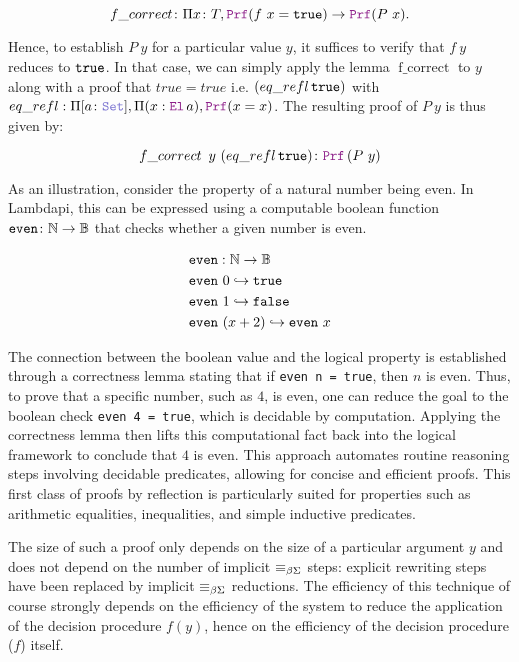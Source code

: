 \begin{equation*}
\mathop{f\_correct} \colon \Pi x \colon T, \prf (f~x = \tt{true}) \ra \prf (P~x).
\end{equation*}

Hence, to establish $P~y$ for a particular value $y$, it suffices to verify that $f~y$ reduces to  $\tt{true}$.
In that case, we can simply apply the lemma $\mathop{f\_correct}$ to $y$ along with a proof that $true = true$ i.e. $(\mathop{eq\_refl} \tt{true})$ with $eq\_refl: \Pi [a \colon \set], \Pi (x: \el\,a), \prf (x = x)$.
The resulting proof of $P~y$ is thus given by:

\begin{equation*}
\mathop{f\_correct} ~y~ (\mathop{eq\_refl} \tt{true}) \colon \prf\,(P~y)
\end{equation*}

As an illustration, consider the property of a natural number being even. In Lambdapi, this can be expressed using a computable boolean function $\texttt{even} \colon \N \ra \B$ that checks whether a given number is even.
\begin{definition}
\begin{align*}
& \kw{even} : \N \ra \B \\
& \kw{even}~0 \re \true \\
& \kw{even}~1 \re \false \\
& \kw{even}~(x + 2) \re \kw{even}~x
\end{align*}
\end{definition}
The connection between the boolean value and the logical property is established through a correctness lemma stating that if \texttt{even n = true}, then $n$ is even.
Thus, to prove that a specific number, such as $4$, is even, one can reduce the goal to the boolean check \texttt{even 4 = true}, which is decidable by computation.
Applying the correctness lemma then lifts this computational fact back into the logical framework to conclude that $4$ is even.
This approach automates routine reasoning steps involving decidable predicates, allowing for concise and efficient proofs.
This first class of proofs by reflection is particularly suited for properties such as arithmetic equalities, inequalities, and simple inductive predicates.

The size of such a proof only depends on the size of a particular argument $y$ and does not depend on the number of implicit $\equivL$ steps: explicit rewriting steps have been replaced by implicit $\equivL$ reductions.
The efficiency of this technique of course strongly depends on the efficiency of the system to reduce the application of the decision procedure $f(y)$, hence on the efficiency of the decision procedure ($f$) itself.


